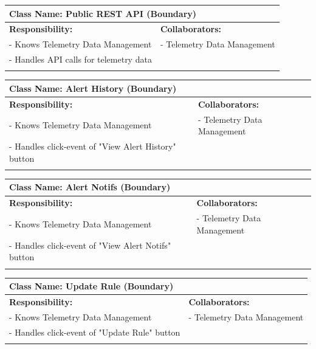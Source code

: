{	\begin{table}[H]
		\centering
		\begin{tabular}{|p{8cm}|p{8cm}|}
		\hline 
		 \multicolumn{2}{|l|}{\textbf{Class Name:} Public REST API (Boundary)} \\
		\hline
		\textbf{Responsibility:} & \textbf{Collaborators:} \\
		\hline
		 - Knows Telemetry Data Management & - Telemetry Data Management \\
		 - Handles API calls for telemetry data \\ 
		\vspace{1in} & \\
		\hline
		\end{tabular}
	\end{table}


	\begin{table}[H]
		\centering
		\begin{tabular}{|p{8cm}|p{8cm}|}
		\hline 
		 \multicolumn{2}{|l|}{\textbf{Class Name:} Alert History (Boundary)} \\
		\hline
		\textbf{Responsibility:} & \textbf{Collaborators:} \\
		\hline
		 - Knows Telemetry Data Management & - Telemetry Data Management \\
		 - Handles click-event of "View Alert History" button\\ 
		\vspace{1in} & \\
		\hline
		\end{tabular}
	\end{table}

	\begin{table}[H]
		\centering
		\begin{tabular}{|p{8cm}|p{8cm}|}
		\hline 
		 \multicolumn{2}{|l|}{\textbf{Class Name:} Alert Notifs (Boundary)} \\
		\hline
		\textbf{Responsibility:} & \textbf{Collaborators:} \\
		\hline
		 - Knows Telemetry Data Management & - Telemetry Data Management \\
		 - Handles click-event of "View Alert Notifs" button\\ 
		\vspace{1in} & \\
		\hline
		\end{tabular}
	\end{table}

	\begin{table}[H]
		\centering
		\begin{tabular}{|p{8cm}|p{8cm}|}
		\hline 
		 \multicolumn{2}{|l|}{\textbf{Class Name:} Update Rule (Boundary)} \\
		\hline
		\textbf{Responsibility:} & \textbf{Collaborators:} \\
		\hline
		 - Knows Telemetry Data Management & - Telemetry Data Management \\
		 - Handles click-event of "Update Rule" button\\ 
		\vspace{1in} & \\
		\hline
		\end{tabular}
	\end{table}

}
